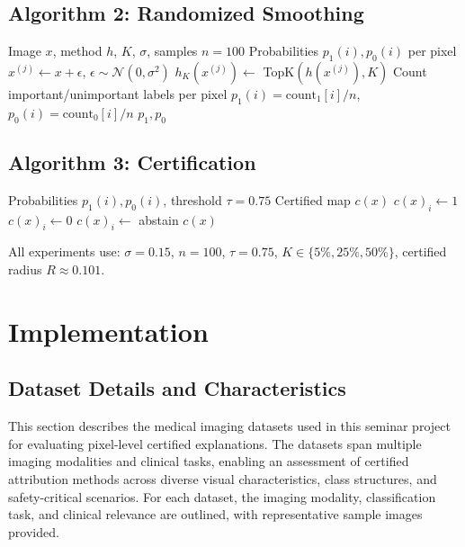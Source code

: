 \documentclass[11pt]{article}
\begin{document}
\subsection{Algorithm 2: Randomized Smoothing}

\begin{algorithm}[H]
\caption{Randomized Smoothing}
\label{alg:randomized_smoothing}
\begin{algorithmic}[1]
\REQUIRE Image $x$, method $h$, $K$, $\sigma$, samples $n=100$
\ENSURE Probabilities $p_1(i), p_0(i)$ per pixel
    \STATE $x^{(j)} \leftarrow x + \epsilon$, $\epsilon \sim \mathcal{N}(0, \sigma^2)$
    \STATE $h_K(x^{(j)}) \leftarrow$ TopK$(h(x^{(j)}), K)$
    \STATE Count important/unimportant labels per pixel
\ENDFOR
\STATE $p_1(i) = \text{count}_1[i] / n$, $p_0(i) = \text{count}_0[i] / n$
\RETURN $p_1, p_0$
\end{algorithmic}
\end{algorithm}

\subsection{Algorithm 3: Certification}

\begin{algorithm}[H]
\caption{Certification}
\label{alg:certification}
\begin{algorithmic}[1]
\REQUIRE Probabilities $p_1(i), p_0(i)$, threshold $\tau=0.75$
\ENSURE Certified map $c(x)$
     $c(x)_i \leftarrow 1$
     $c(x)_i \leftarrow 0$
    \ELSE $c(x)_i \leftarrow$ abstain
    \ENDIF
\ENDFOR
\RETURN $c(x)$
\end{algorithmic}
\end{algorithm}


All experiments use: $\sigma = 0.15$, $n = 100$, $\tau = 0.75$, $K \in \{5\%, 25\%, 50\%\}$, certified radius $R \approx 0.101$.


\section{Implementation}

\subsection{Dataset Details and Characteristics}

This section describes the medical imaging datasets used in this seminar project for evaluating pixel-level certified explanations. The datasets span multiple imaging modalities and clinical tasks, enabling an assessment of certified attribution methods across diverse visual characteristics, class structures, and safety-critical scenarios. For each dataset, the imaging modality, classification task, and clinical relevance are outlined, with representative sample images provided.
\end{document}
